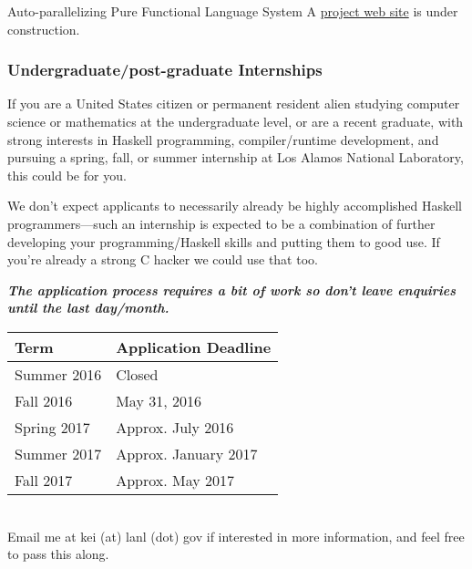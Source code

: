 \documentclass[DIV16,twocolumn,10pt]{scrreprt}
\begin{document}
\begin{hcarentry}{Auto-parallelizing Pure Functional Language System}
\FurtherReading
 A \href{https://github.com/losalamos/APPFL}{project web site} is under construction.

\subsubsection*{Undergraduate/post-graduate Internships}

If you are a United States citizen or permanent resident alien studying
computer science or mathematics at the undergraduate level, or are a recent
graduate, with strong interests in Haskell programming, compiler/runtime
development, and pursuing a spring, fall, or summer internship at Los
Alamos National Laboratory, this could be for you.

We don't expect applicants to necessarily already be highly accomplished
Haskell programmers---such an internship is expected to be a combination of
further developing your programming/Haskell skills and putting them to good
use.  If you're already a strong C hacker we could use that too.

\emph{\bfseries The application process requires a bit of work so don't leave
  enquiries until the last day/month.}\\

\begin{tabular}{l|l}
Term & Application Deadline \\
\hline
Summer 2016  & Closed \\
Fall 2016    & May 31, 2016 \\
Spring 2017  & Approx. July 2016 \\
Summer 2017  & Approx. January 2017 \\
Fall 2017    & Approx. May 2017
\end{tabular}\\

\noindent Email me at kei (at) lanl (dot) gov if interested in more information, and
feel free to pass this along. \\

\end{hcarentry}
\end{document}
